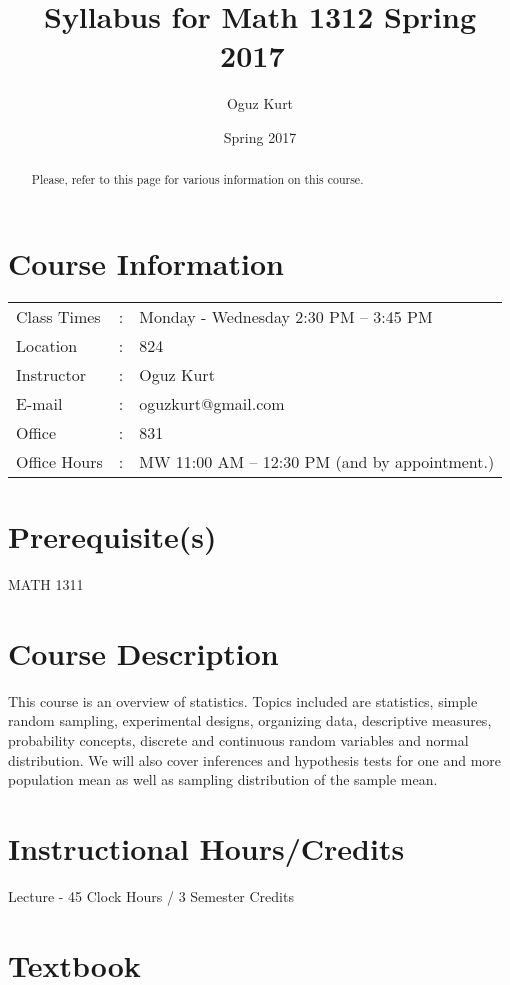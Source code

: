 \documentclass[handout]{ximera}
\title{Syllabus for Math 1312 \hfill
Spring 2017 \hfill \,}
\author{Oguz Kurt}
\date{Spring 2017}
\begin{document}
\begin{abstract}
Please, refer to this page for various information on this course.
\end{abstract} 
\maketitle

\section*{Course Information}
\begin{tabular}[c]{lll}
Class Times & : &  Monday - Wednesday 2:30 PM -- 3:45 PM  \\
Location & : &  824  \\
Instructor & : &  Oguz Kurt  \\
E-mail & : &   oguzkurt@gmail.com \\
Office & : & 831 \\
Office Hours & : & MW 11:00 AM -- 12:30 PM (and by appointment.)
\end{tabular}

\section*{Prerequisite(s)}

MATH 1311

\section*{Course Description}

This course is an overview of statistics. Topics included are statistics, simple random sampling, experimental designs, organizing data, descriptive measures, probability concepts, discrete and continuous random variables and normal distribution. We will also cover inferences and hypothesis tests for one and more population mean as well as sampling distribution of the sample mean.

\section*{Instructional Hours/Credits}

Lecture - 45 Clock Hours / 3 Semester Credits

\section*{Textbook}
\end{document}
